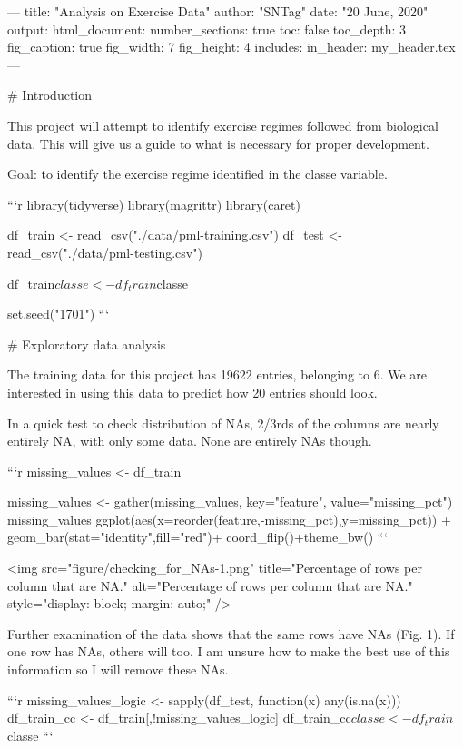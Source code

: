 ---
title: "Analysis on Exercise Data"
author: "SNTag"
date: "20 June, 2020"
output:
  html_document:
    number_sections: true
    toc: false
    toc_depth: 3
    fig_caption: true
    fig_width: 7
    fig_height: 4
    includes:
      in_header: my_header.tex
---



# Introduction

This project will attempt to identify exercise regimes followed from biological data. This will
give us a guide to what is necessary for proper development.

Goal: to identify the exercise regime identified in the classe variable.



```r
library(tidyverse)
library(magrittr)
library(caret)

df_train <- read_csv("./data/pml-training.csv")
df_test  <- read_csv("./data/pml-testing.csv")

df_train$classe <- df_train$classe %

set.seed("1701")
```

# Exploratory data analysis

The training data for this project has 19622 entries, belonging
to 6. We are interested in using this data to predict
how 20 entries should look.

In a quick test to check distribution of NAs, 2/3rds of the columns are nearly entirely NA, with
only some data. None are entirely NAs though.


```r
missing_values <- df_train %

missing_values <- gather(missing_values, key="feature", value="missing_pct")
missing_values %
    ggplot(aes(x=reorder(feature,-missing_pct),y=missing_pct)) +
    geom_bar(stat="identity",fill="red")+
    coord_flip()+theme_bw()
```

<img src="figure/checking_for_NAs-1.png" title="Percentage of rows per column that are NA." alt="Percentage of rows per column that are NA." style="display: block; margin: auto;" />

Further examination of the data shows that the same rows have NAs (Fig. 1). If one row has NAs, others will
too. I am unsure how to make the best use of this information so I will remove these NAs.


```r
missing_values_logic <- sapply(df_test, function(x) any(is.na(x)))
df_train_cc          <- df_train[,!missing_values_logic]
df_train_cc$classe   <- df_train$classe %
```

